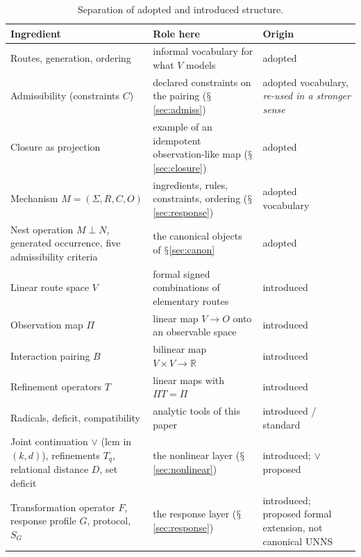 \documentclass[11pt,a4paper]{article}
\renewcommand{\S}{\ensuremath{\mathsection}}
\newcommand{\RR}{\mathbb{R}}
\newcommand{\vj}{\mathbin{\vee}}
\theoremstyle{plain}
\theoremstyle{definition}
\begin{document}
\begin{table}[t]
\centering\small
\begin{tabularx}{\textwidth}{@{}p{}Xp{}@{}}
\toprule
Ingredient & Role here & Origin\\
\midrule
Routes, generation, ordering & informal vocabulary for what $V$ models & adopted~\cite{G3}\\
Admissibility (constraints $C$) & declared constraints on the pairing (\S\ref{sec:admiss}) & adopted vocabulary, \emph{re-used in a stronger sense}\\
Closure as projection & example of an idempotent observation-like map (\S\ref{sec:closure}) & adopted~\cite{G7,G5}\\
Mechanism $M=(\Sigma,R,C,O)$ & ingredients, rules, constraints, ordering (\S\ref{sec:response}) & adopted vocabulary~\cite{G3}\\
Nest operation $M\perp N$, generated occurrence, five admissibility criteria & the canonical objects of \S\ref{sec:canon} & adopted~\cite{G11,G12}\\
Linear route space $V$ & formal signed combinations of elementary routes & introduced\\
Observation map $\Pi$ & linear map $V\to O$ onto an observable space & introduced\\
Interaction pairing $B$ & bilinear map $V\times V\to\RR$ & introduced\\
Refinement operators $T$ & linear maps with $\Pi T=\Pi$ & introduced\\
Radicals, deficit, compatibility & analytic tools of this paper & introduced / standard\\
Joint continuation $\vj$ (lcm in $(k,d)$), refinements $T_q$, relational distance $D$, set deficit & the nonlinear layer (\S\ref{sec:nonlinear}) & introduced; $\vj$ proposed\\
Transformation operator $F$, response profile $G$, protocol, $S_G$ & the response layer (\S\ref{sec:response}) & introduced; proposed formal extension, not canonical UNNS\\
\bottomrule
\end{tabularx}
\caption{Separation of adopted and introduced structure.}\label{tab:adopt}
\end{table}
\end{document}
